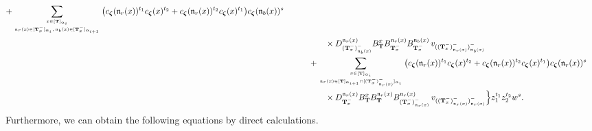 \documentclass[12pt]{amsart}
\numberwithin{equation}{thm}
\newcommand\bT{\mathbf T}
\newcommand\fn{\mathfrak n}
\renewcommand\a{\alpha}  %
\newcommand\Bz{\boldsymbol\zeta}
\begin{document}
\begin{align}
	+ \sum_{ x \in [\bT]_{\a_i} \atop\fn_r (x) \in [\bT_x^-]_{\a_i}, \, \fn_b(x) \in [\bT_x^-]_{\a_{i+1}} } 
		\big( c_{\Bz} (\fn_r (x))^{t_1} c_{\Bz} (x)^{t_2} + c_{\Bz} (\fn_r (x))^{t_2} c_{\Bz} (x)^{t_1} \big) c_{\Bz}( \fn_b (x))^s 
		\\ \notag & \hspace{5em} \times 
		D_{(\bT_x^-)_{\fn_b(x)}^-}^{\fn_r (x)} 
		B_{\bT}^x  B_{\bT_x^-}^{\fn_r (x)} B_{\bT_x^-}^{\fn_b(x)} 
		\, v_{((\bT_x^-)_{\fn_r(x)}^- )_{\fn_b(x)}^-}
	\\ \notag & \hspace{3em} 
	+ \sum_{x \in [\bT]_{\a_i} \atop \fn_r(x) \in [\bT]_{\a_{i+1}} \cap [(\bT_x^-)_{\fn_r(x)}^-]_{\a_i}} 
		\big( c_{\Bz} (\fn_r(x))^{t_1} c_{\Bz} (x)^{t_2} + c_{\Bz} (\fn_r(x))^{t_2} c_{\Bz} (x)^{t_1} \big) c_{\Bz} (\fn_r (x))^s 
		\\ \notag & \hspace{5em} \times 
		D_{\bT_x^-}^{\fn_r (x)} 
		B_{\bT}^x  B_{\bT}^{\fn_r(x)}  B_{(\bT_x^-)_{\fn_r(x)}^-}^{\fn_r(x)} 
		\, v_{((\bT_x^-)_{\fn_r(x)}^-)_{\fn_r(x)}^-} 
	\Big\} z_1^{t_1} z_2^{t_2} w^s. 
\end{align}
Furthermore, 
we can obtain the following equations by direct calculations. 
\end{document}
